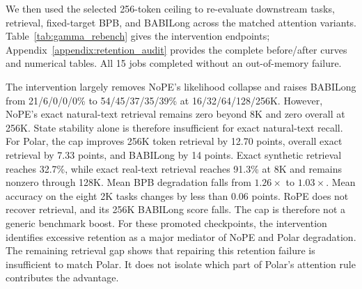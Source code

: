 \documentclass{article}
\begin{document}
We then used the selected 256-token ceiling to re-evaluate downstream tasks, retrieval, fixed-target BPB, and BABILong across the matched attention variants. Table~\ref{tab:gamma_rebench} gives the intervention endpoints; Appendix~\ref{appendix:retention_audit} provides the complete before/after curves and numerical tables. All 15 jobs completed without an out-of-memory failure.

\begin{table}[!ht]
\centering
\small
\setlength{\tabcolsep}{2.6pt}
\caption{Inference-only retention diagnostic. Results show archived baseline $\rightarrow$ one-head 256-token half-life cap. Base mean averages eight 2K tasks (\%). Retrieval is token/exact accuracy (\%), BABI is macro exact match, and BPB averages three fixed-target datasets. The cap is a probe, not a proposed trained model.}
\label{tab:gamma_rebench}
\end{table}

The intervention largely removes NoPE's likelihood collapse and raises BABILong from 21/6/0/0/0\% to 54/45/37/35/39\% at 16/32/64/128/256K. However, NoPE's exact natural-text retrieval remains zero beyond 8K and zero overall at 256K. State stability alone is therefore insufficient for exact natural-text recall. For Polar, the cap improves 256K token retrieval by 12.70 points, overall exact retrieval by 7.33 points, and BABILong by 14 points. Exact synthetic retrieval reaches 32.7\%, while exact real-text retrieval reaches 91.3\% at 8K and remains nonzero through 128K. Mean BPB degradation falls from $1.26\times$ to $1.03\times$. Mean accuracy on the eight 2K tasks changes by less than 0.06 points. RoPE does not recover retrieval, and its 256K BABILong score falls. The cap is therefore not a generic benchmark boost. For these promoted checkpoints, the intervention identifies excessive retention as a major mediator of NoPE and Polar degradation. The remaining retrieval gap shows that repairing this retention failure is insufficient to match Polar. It does not isolate which part of Polar's attention rule contributes the advantage.
\end{document}

